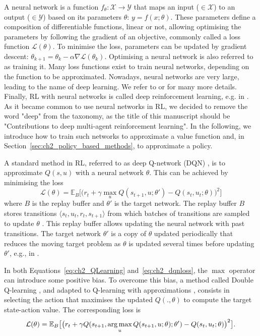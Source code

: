 A neural network is a function $f_\theta: \mathcal{X} \rightarrow \mathcal{Y}$ that maps an input ($\in\mathcal{X}$) to an output ($\in\mathcal{Y}$) based on its parameters $\theta$: $y = f(x;\theta)$.
These parameters define a composition of differentiable functions, linear or not, allowing optimising the parameters by following the gradient of an objective, commonly called a loss function $\mathcal{L}(\theta)$.
To minimise the loss, parameters can be updated by gradient descent: $\theta_{k+1} = \theta_k - \alpha \nabla \mathcal{L}(\theta_k)$.
Optimising a neural network is also referred to as training it.
Many loss functions exist to train neural networks, depending on the function to be approximated.
Nowadays, neural networks are very large, leading to the name of deep learning.
We refer to \citep{zhang2023dive} or \citep{prince2023understanding} for many more details.
Finally, RL with neural networks is called deep reinforcement learning, e.g. in \citep{introDeepRL}.
As it became common to use neural networks in RL, we decided to remove the word "deep" from the taxonomy, as the title of this manuscript should be "Contributions to deep multi-agent reinforcement learning".
In the following, we introduce how to train such networks to approximate a value function and, in Section~\ref{sec:ch2_policy_based_methods}, to approximate a policy.

A standard method in RL, referred to as deep Q-network (DQN) \citep{Mnih2015}, is to approximate $Q(s, u)$ with a neural network $\theta$.
This can be achieved by minimising the loss 
\begin{equation}
\label{eq:ch2_dqnloss}
    \mathcal{L}(\theta) = \mathbb{E}_B \big[\big(r_{t} + \gamma \max_u Q(s_{t+1}, u; \theta')- Q(s_{t}, u_{t}; \theta)\big)^{2}\big]
\end{equation}
where $B$ is the replay buffer and $\theta'$ is the target network.
The replay buffer $B$ stores transitions $\langle s_{t},u_{t},r_{t},s_{t+1}\rangle$ from which batches of transitions are sampled to update $\theta$ \citep{lin1992self}.
This replay buffer allows updating the neural network with past transitions.
The target network $\theta'$ is a copy of $\theta$ updated periodically that reduces the moving target problem as $\theta$ is updated several times before updating $\theta'$, e.g., in \citep{Mnih2015}.

In both Equations~\ref{eq:ch2_QLearning} and~\ref{eq:ch2_dqnloss}, the $\max$ operator can introduce some positive bias. 
To overcome this bias, a method called Double Q-learning \citep{hasselt2010double}, and adapted to Q-learning with approximations \citep{van2016deep}, consists in selecting the action that maximises the updated $Q(., \theta)$ to compute the target state-action value.
The corresponding loss is 
\begin{equation}
    \label{eq:ch2_doubleQ}
    \mathcal{L}(\theta) = \mathbb{E}_{B} \big[\big(r_{t} + \gamma Q(s_{t+1}, \operatorname*{arg\,max}_u Q(s_{t+1}, u;\theta) ; \theta')- Q(s_{t}, u_{t}; \theta)\big)^{2}\big].
\end{equation}

